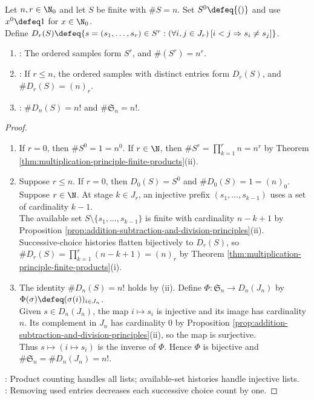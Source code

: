 \begin{proposition} \label{prop:ordered-sampling-with-and-without-replacement} \\
Let $n,r\in\N_0$ and let $S$ be finite with $\#S=n$. Set $S^0\defeq\{()\}$ and use $x^0\defeq1$ for $x\in\N_0$.\\
Define $D_r(S)\defeq\{s=(s_1,\ldots,s_r)\in S^r:(\forall i,j\in J_r)\,[i<j\Rightarrow s_i\neq s_j]\}$.
\begin{enumerate}[label=(\roman*)]
\setlength{\itemsep}{0pt}
\item {}: The ordered samples form $S^r$, and $\#(S^r)=n^r$.
\item {}: If $r\leq n$, the ordered samples with distinct entries form $D_r(S)$, and $\#D_r(S)=(n)_r$.
\item {}: $\#D_n(S)=n!$ and $\#\mathfrak{S}_n=n!$.
\end{enumerate}
\begin{proof}
\begin{enumerate}[label=(\roman*)]
\setlength{\itemsep}{0pt}
\item If $r=0$, then $\#S^0=1=n^0$. If $r\in\N$, then $\#S^r=\prod\limits_{k=1}^{r}n=n^r$ by Theorem \ref{thm:multiplication-principle-finite-products}(ii).
\item Suppose $r\leq n$. If $r=0$, then $D_0(S)=S^0$ and $\#D_0(S)=1=(n)_0$.\\
Suppose $r\in\N$. At stage $k\in J_r$, an injective prefix $(s_1,\ldots,s_{k-1})$ uses a set of cardinality $k-1$.\\
The available set $S\setminus\{s_1,\ldots,s_{k-1}\}$ is finite with cardinality $n-k+1$ by Proposition \ref{prop:addition-subtraction-and-division-principles}(ii).\\
Successive-choice histories flatten bijectively to $D_r(S)$, so $\#D_r(S)=\prod\limits_{k=1}^{r}(n-k+1)=(n)_r$ by Theorem \ref{thm:multiplication-principle-finite-products}(i).
\item The identity $\#D_n(S)=n!$ holds by (ii). Define $\Phi:\mathfrak{S}_n\to D_n(J_n)$ by $\Phi(\sigma)\defeq(\sigma(i))_{i\in J_n}$.\\
Given $s\in D_n(J_n)$, the map $i\mapsto s_i$ is injective and its image has cardinality $n$. Its complement in $J_n$ has cardinality $0$ by Proposition \ref{prop:addition-subtraction-and-division-principles}(ii), so the map is surjective.\\
Thus $s\mapsto(i\mapsto s_i)$ is the inverse of $\Phi$. Hence $\Phi$ is bijective and $\#\mathfrak{S}_n=\#D_n(J_n)=n!$.
\end{enumerate}
: Product counting handles all lists; available-set histories handle injective lists.\\
: Removing used entries decreases each successive choice count by one.
\end{proof}
\end{proposition}

